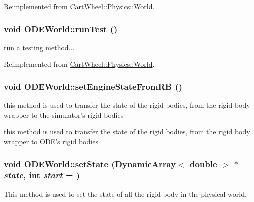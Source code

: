 Reimplemented from \hyperlink{classCartWheel_1_1Physics_1_1World_a5f13914f86bf8007f88b238111233ff6}{CartWheel::Physics::World}.

\hypertarget{classCartWheel_1_1Physics_1_1ODEWorld_a24befdbc6e6997f125d65b649c5b8fde}{
\subsubsection[{runTest}]{\setlength{\rightskip}{0pt plus 5cm}void ODEWorld::runTest ()}}
\label{classCartWheel_1_1Physics_1_1ODEWorld_a24befdbc6e6997f125d65b649c5b8fde}
run a testing method... 

Reimplemented from \hyperlink{classCartWheel_1_1Physics_1_1World_a2181315ea3069768c0c10f9a9d632f89}{CartWheel::Physics::World}.

\hypertarget{classCartWheel_1_1Physics_1_1ODEWorld_a4413b4b3d3918f05ef2c5fbda8da9af2}{
\subsubsection[{setEngineStateFromRB}]{\setlength{\rightskip}{0pt plus 5cm}void ODEWorld::setEngineStateFromRB ()}}
\label{classCartWheel_1_1Physics_1_1ODEWorld_a4413b4b3d3918f05ef2c5fbda8da9af2}
this method is used to transfer the state of the rigid bodies, from the rigid body wrapper to the simulator's rigid bodies

this method is used to transfer the state of the rigid bodies, from the rigid body wrapper to ODE's rigid bodies \hypertarget{classCartWheel_1_1Physics_1_1ODEWorld_ad5f89cdc454b093096825455db1fb294}{
\subsubsection[{setState}]{\setlength{\rightskip}{0pt plus 5cm}void ODEWorld::setState (DynamicArray$<$ double $>$ $\ast$ {\em state}, \/  int {\em start} = {})}}
\label{classCartWheel_1_1Physics_1_1ODEWorld_ad5f89cdc454b093096825455db1fb294}
This method is used to set the state of all the rigid body in the physical world.

